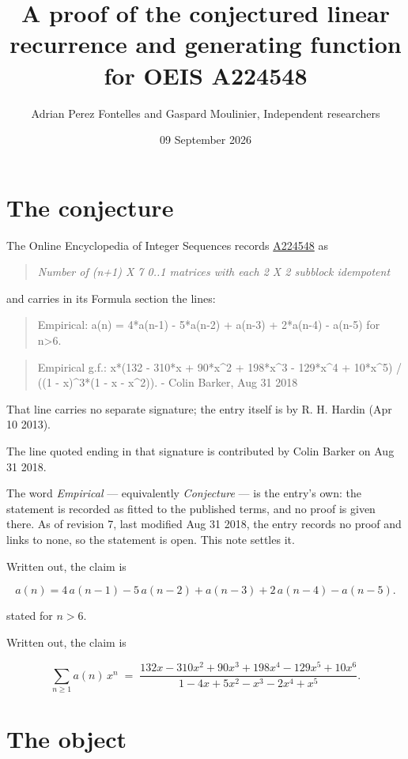 \documentclass[11pt]{article}
\title{A proof of the conjectured linear recurrence and generating function for OEIS A224548}
\author{Adrian Perez Fontelles and Gaspard Moulinier, Independent researchers}
\date{09 September 2026}
\theoremstyle{definition}
\begin{document}
\maketitle
\section{The conjecture}

The Online Encyclopedia of Integer Sequences records \href{https://oeis.org/A224548}{A224548} as

\begin{quote}\itshape Number of (n+1) X 7 0..1 matrices with each 2 X 2 subblock idempotent\end{quote}

and carries in its Formula section the lines:

\begin{quote}\ttfamily Empirical: a(n) = 4*a(n-1) - 5*a(n-2) + a(n-3) + 2*a(n-4) - a(n-5) for n>6.\end{quote}

\begin{quote}\ttfamily Empirical g.f.: x*(132 - 310*x + 90*x\textasciicircum{}2 + 198*x\textasciicircum{}3 - 129*x\textasciicircum{}4 + 10*x\textasciicircum{}5) / ((1 - x)\textasciicircum{}3*(1 - x - x\textasciicircum{}2)). - Colin Barker, Aug 31 2018\end{quote}

That line carries no separate signature; the entry itself is by R. H. Hardin (Apr 10 2013).

The line quoted ending in that signature is contributed by Colin Barker on Aug 31 2018.

The word {\itshape Empirical} --- equivalently {\itshape Conjecture} --- is the entry's own: the statement is recorded as fitted to the published terms, and no proof is given there. As of revision 7, last modified Aug 31 2018, the entry records no proof and links to none, so the statement is open. This note settles it.

Written out, the claim is

\[a(n) = 4\,a(n-1) - 5\,a(n-2) + a(n-3) + 2\,a(n-4) - a(n-5).\]

stated for $n > 6$.

Written out, the claim is

\[\sum_{n \ge 1} a(n)\,x^n \;=\; \frac{132x - 310x^{2} + 90x^{3} + 198x^{4} - 129x^{5} + 10x^{6}}{1 - 4x + 5x^{2} - x^{3} - 2x^{4} + x^{5}}.\]

\section{The object}
\end{document}
